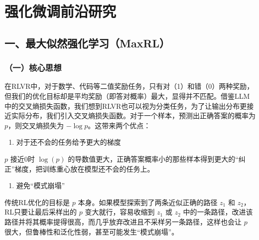 \setcounter{section}{4}

\hypertarget{ux5f3aux5316ux5faeux8c03ux524dux6cbfux7814ux7a76}{%
\section{强化微调前沿研究}\label{ux5f3aux5316ux5faeux8c03ux524dux6cbfux7814ux7a76}}

\hypertarget{ux4e00ux6700ux5927ux4f3cux7136ux5f3aux5316ux5b66ux4e60maxrl}{%
\subsection{一、最大似然强化学习（MaxRL）}\label{ux4e00ux6700ux5927ux4f3cux7136ux5f3aux5316ux5b66ux4e60maxrl}}

\hypertarget{ux4e00ux6838ux5fc3ux601dux60f3-9}{%
\subsubsection{（一）核心思想}\label{ux4e00ux6838ux5fc3ux601dux60f3-9}}

在RLVR中，对于数学、代码等二值奖励任务，只有对（1）和错（0）两种奖励，但我们的优化目标却是平均奖励（即答对概率）最大，显得并不匹配。借鉴LLM中的交叉熵损失函数，我们想到RLVR也可以视为分类任务，为了让输出分布更接近实际分布，我们引入交叉熵损失函数。对于一个样本，预测出正确答案的概率为 \(p\)，则交叉熵损失为 \(-\log p\)。这带来两个优点：

\begin{enumerate}
\def\labelenumi{\arabic{enumi}.}
\tightlist
\item
  对于还不会的任务给予更大的梯度
\end{enumerate}

\(p\) 接近0时 \(\log(p)\) 的导数值更大，正确答案概率小的那些样本得到更大的``纠正''梯度，把训练重心放在模型还不会的任务上。

\begin{enumerate}
\def\labelenumi{\arabic{enumi}.}
\setcounter{enumi}{1}
\tightlist
\item
  避免``模式崩塌''
\end{enumerate}

传统RL优化的目标是 \(p\) 本身。如果模型探索到了两条近似正确的路径 \(z_1\) 和 \(z_2\)，RL只要让最后采样出的 \(p\) 变大就行，容易收缩到 \(z_1\) 或 \(z_2\) 中的一条路径，改进该路径并将其概率提得很高，而几乎放弃改进且不采样另一条路径，这样也会让 \(p\) 很大，但鲁棒性和泛化性弱，甚至可能发生``模式崩塌''。

